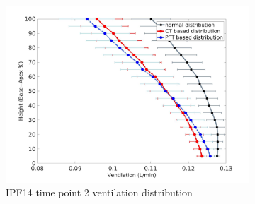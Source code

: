 \begin{figure}[htbp]  
\centering
\begin{subfigure}{.6\linewidth}%
  \includegraphics[width=\linewidth,trim={{.0\wd0} {.0\wd0} {.0\wd0} {.0\wd0}},clip]{Appendix/Image_AppexB/IPF1402/IPF1402_VentilationAgainstLungHeight.jpg} %
  \caption{IPF14 time point 2 ventilation distribution}
  \label{fig:IPF1402VQDistribution-a} 
\end{subfigure} 
\begin{subfigure}{.6\linewidth}%

\end{subfigure}
\end{figure}

